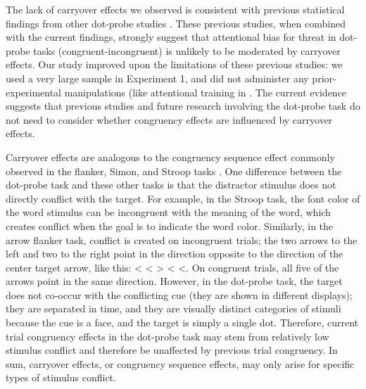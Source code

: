 \documentclass[issue,header,twocolumn,empirical, authordate,10pt]{jote-new-article}
\begin{document}
The lack of carryover effects we observed is consistent with previous statistical findings from other dot-probe studies \parencite{Gladwin2017, Hill2016, Hill2016}. These previous studies, when combined with the current findings, strongly suggest that attentional bias for threat in dot-probe tasks (congruent-incongruent) is unlikely to be moderated by carryover effects. Our study improved upon the limitations of these previous studies: we used a very large sample in Experiment 1, and did not administer any prior-experimental manipulations (like attentional training in \parencite{Hill2016}. The current evidence suggests that previous studies and future research involving the dot-probe task do not need to consider whether congruency effects are influenced by carryover effects.

Carryover effects are analogous to the congruency sequence effect commonly observed in the flanker, Simon, and Stroop tasks \parencite{Duthoo2014}. One difference between the dot-probe task and these other tasks is that the distractor stimulus does not directly conflict with the target. For example, in the Stroop task, the font color of the word stimulus can be incongruent with the meaning of the word, which creates conflict when the goal is to indicate the word color. Similarly, in the arrow flanker task, conflict is created on incongruent trials; the two arrows to the left and two to the right point in the direction opposite to the direction of the center target arrow, like this: < < > < <. On congruent trials, all five of the arrows point in the same direction. However, in the dot-probe task, the target does not co-occur with the conflicting cue (they are shown in different displays); they are separated in time, and they are visually distinct categories of stimuli because the cue is a face, and the target is simply a single dot. Therefore, current trial congruency effects in the dot-probe task may stem from relatively low stimulus conflict and therefore be unaffected by previous trial congruency. In sum, carryover effects, or congruency sequence effects, may only arise for specific types of stimulus conflict.
\end{document}
